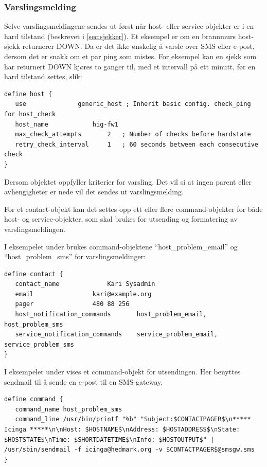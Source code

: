 \subsubsection{Varslingsmelding}
Selve varslingsmeldingene sendes ut først når host- eller service-objekter er i en hard tilstand (beskrevet i \ref{sec:sjekker}). Et eksempel er om en brannmurs host-sjekk returnerer DOWN. Da er det ikke ønskelig å varsle over SMS eller e-post, dersom det er snakk om et par ping som mistes. For eksempel kan en sjekk som har returnert DOWN kjøres to ganger til, med et intervall på ett minutt, før en hard tilstand settes, slik:

\begin{lstlisting}[style=example]
define host {
   use 				generic_host ; Inherit basic config. check_ping for host_check
   host_name			hig-fw1
   max_check_attempts   	2 	; Number of checks before hardstate
   retry_check_interval		1 	; 60 seconds between each consecutive check
}
\end{lstlisting}
Dersom objektet oppfyller kriterier for varsling. Det vil si at ingen parent eller avhengigheter er nede vil det sendes ut varslingsmelding.
 
For et contact-objekt kan det settes opp ett eller flere command-objekter for både host- og service-objekter, som skal brukes for utsending og formatering av varslingsmeldingen.  

I eksempelet under brukes command-objektene ``host\_problem\_email'' og ``host\_problem\_sms'' for varslingsmeldinger:
\begin{lstlisting}[style=example]
define contact {
   contact_name 			Kari Sysadmin
   email 				kari@example.org
   pager 				480 88 256 
   host_notification_commands    	host_problem_email, host_problem_sms
   service_notification_commands 	service_problem_email, service_problem_sms
}
\end{lstlisting}

I eksempelet under vises et command-objekt for utsendingen. Her benyttes sendmail\cite{wiki:sendmail} til å sende en e-post til en SMS-gateway.
\begin{lstlisting}[style=example]
define command {
   command_name host_problem_sms
   command_line /usr/bin/printf "%b" "Subject:$CONTACTPAGER$\n***** Icinga *****\n\nHost: $HOSTNAME$\nAddress: $HOSTADDRESS$\nState: $HOSTSTATE$\nTime: $SHORTDATETIME$\nInfo: $HOSTOUTPUT$" | /usr/sbin/sendmail -f icinga@hedmark.org -v $CONTACTPAGER$@smsgw.sms
}
\end{lstlisting}


